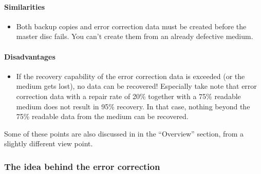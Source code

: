 \paragraph{Similarities}\quad

\begin{itemize}
\item Both backup copies and error correction data must
  be created before the master disc fails. You can't create
  them from an already defective medium.
\end{itemize}

\paragraph{Disadvantages}

\begin{itemize}
\item If the recovery capability of the error correction
  data is exceeded (or the medium gets lost), no data
  can be recovered! Especially take note that error
  correction data with a repair rate of 20\% together
  with a 75\% readable medium does not result
  in 95\% recovery. In that case, nothing beyond the 75\% readable
  data from the medium can be recovered.
\end{itemize}

Some of these points are also discussed in
 in the
``Overview'' section, from a slightly different view point.

\subsubsection{The idea behind the error correction}
\label{bigpicture-ecc}

\bigskip


